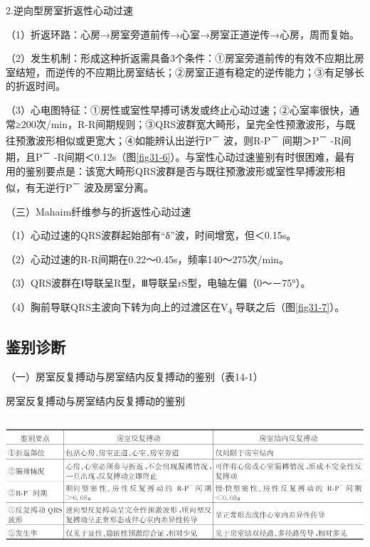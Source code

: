 2.逆向型房室折返性心动过速

（1）折返环路：心房→房室旁道前传→心室→房室正道逆传→心房，周而复始。

（2）发生机制：形成这种折返需具备3个条件：①房室旁道前传的有效不应期比房室结短，而逆传的不应期比房室结长；②房室正道有稳定的逆传能力；③有足够长的折返时间。

（3）心电图特征：①房性或室性早搏可诱发或终止心动过速；②心室率很快，通常≥200次/min，R-R间期规则；③QRS波群宽大畸形，呈完全性预激波形，与既往预激波形相似或更宽大；④如能辨认出逆行P\textsuperscript{－}
波，则R-P\textsuperscript{－} 间期＞P\textsuperscript{－}
-R间期，且P\textsuperscript{－}
-R间期＜0.12s（图\ref{fig31-6}）。与室性心动过速鉴别有时很困难，最有用的鉴别要点是：该宽大畸形QRS波群是否与既往预激波形或室性早搏波形相似，有无逆行P\textsuperscript{－}
波及房室分离。

（三）Mahaim纤维参与的折返性心动过速

（1）心动过速的QRS波群起始部有“δ”波，时间增宽，但＜0.15s。

（2）心动过速的R-R间期在0.22～0.45s，频率140～275次/min。

（3）QRS波群在Ⅰ导联呈R型，Ⅲ导联呈rS型，电轴左偏（0～－75°）。

（4）胸前导联QRS主波向下转为向上的过渡区在V\textsubscript{4}
导联之后（图\ref{fig31-7}）。

\protect\hypertarget{text00021.htmlux5cux23subid248}{}{}

\subsection{鉴别诊断}

（一）房室反复搏动与房室结内反复搏动的鉴别（表14-1）

\begin{table}[htbp]
\centering
\caption{房室反复搏动与房室结内反复搏动的鉴别}
\label{tab14-1}
\includegraphics[width=6.21875in,height=1.95833in]{./images/Image00265.jpg}
\end{table}

